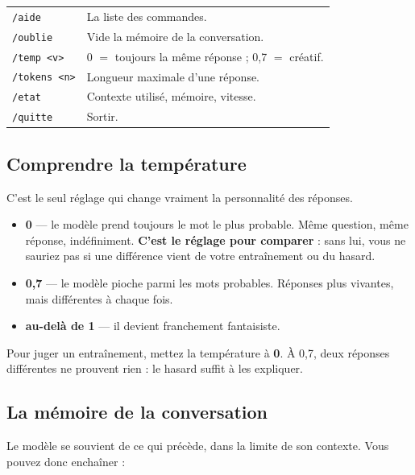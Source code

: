 \begin{center}
\begin{tabular}{lp{9.4cm}}
\toprule
\texttt{/aide} & La liste des commandes. \\
\texttt{/oublie} & Vide la mémoire de la conversation. \\
\texttt{/temp <v>} & 0 $=$ toujours la même réponse ; 0,7 $=$ créatif. \\
\texttt{/tokens <n>} & Longueur maximale d'une réponse. \\
\texttt{/etat} & Contexte utilisé, mémoire, vitesse. \\
\texttt{/quitte} & Sortir. \\
\bottomrule
\end{tabular}
\end{center}

\subsection{Comprendre la température}

C'est le seul réglage qui change vraiment la personnalité des réponses.

\begin{itemize}
  \item \textbf{0} — le modèle prend toujours le mot le plus probable. Même
        question, même réponse, indéfiniment. \textbf{C'est le réglage pour
        comparer} : sans lui, vous ne sauriez pas si une différence vient de
        votre entraînement ou du hasard.
  \item \textbf{0,7} — le modèle pioche parmi les mots probables. Réponses plus
        vivantes, mais différentes à chaque fois.
  \item \textbf{au-delà de 1} — il devient franchement fantaisiste.
\end{itemize}

\begin{nkpiege}
Pour juger un entraînement, mettez la température à \textbf{0}. À 0,7, deux
réponses différentes ne prouvent rien : le hasard suffit à les expliquer.
\end{nkpiege}

\subsection{La mémoire de la conversation}

Le modèle se souvient de ce qui précède, dans la limite de son contexte. Vous
pouvez donc enchaîner :

